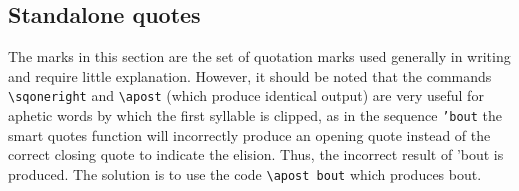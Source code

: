 \documentclass{article}
\begin{document}
\subsection{Standalone quotes}
The marks in this section are the set of quotation marks used generally in writing and require little explanation.  However, it should be noted that the  commands {\color{dsg}\verb!\sqoneright!} and {\color{dsg}\verb!\apost!} (which produce identical output) are very useful for aphetic words by which the first syllable is clipped, as in the sequence {\color{dsg}\texttt{'bout}} the smart quotes function will incorrectly produce an opening quote instead of the correct closing quote to indicate the elision.  Thus, the incorrect result of {\color{red} 'bout} is produced.  The solution is to use the code {\color{dsg}\verb!\apost bout!} which produces \textcolor{dsg}{\apost bout}.
\end{document}
